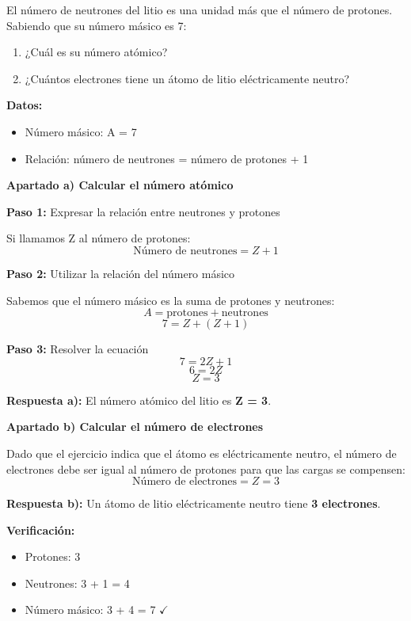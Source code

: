 \begin{exercise}
    El número de neutrones del litio es una unidad más que el número de protones. Sabiendo que su número másico es 7:
    \begin{enumerate}[label=\letraminuscula]
    \item ¿Cuál es su número atómico?
    \item ¿Cuántos electrones tiene un átomo de litio eléctricamente neutro?
    \end{enumerate}
    \begin{solu}
        \textbf{Datos:}
        \begin{itemize}
            \item Número másico: A = 7
            \item Relación: número de neutrones = número de protones + 1
        \end{itemize}

        \textbf{Apartado a) Calcular el número atómico}

        \textbf{Paso 1:} Expresar la relación entre neutrones y protones

        Si llamamos Z al número de protones:
        \[
            \text{Número de neutrones} = Z + 1
        \]

        \textbf{Paso 2:} Utilizar la relación del número másico

        Sabemos que el número másico es la suma de protones y neutrones:
        \[
            A = \text{protones} + \text{neutrones}
        \]
        \[
            7 = Z + (Z + 1)
        \]

        \textbf{Paso 3:} Resolver la ecuación
        \[
            7 = 2Z + 1
        \]
        \[
            6 = 2Z
        \]
        \[
            Z = 3
        \]

        \textbf{Respuesta a):} El número atómico del litio es \textbf{Z = 3}.

        \textbf{Apartado b) Calcular el número de electrones}

        Dado que el ejercicio indica que el átomo es eléctricamente neutro, el número de electrones debe ser igual al número de protones para que las cargas se compensen:
        \[
            \text{Número de electrones} = Z = 3
        \]

        \textbf{Respuesta b):} Un átomo de litio eléctricamente neutro tiene \textbf{3 electrones}.

        \textbf{Verificación:}
        \begin{itemize}
            \item Protones: 3
            \item Neutrones: 3 + 1 = 4
            \item Número másico: 3 + 4 = 7 \( \checkmark \)
        \end{itemize}
    \end{solu}
\end{exercise}
